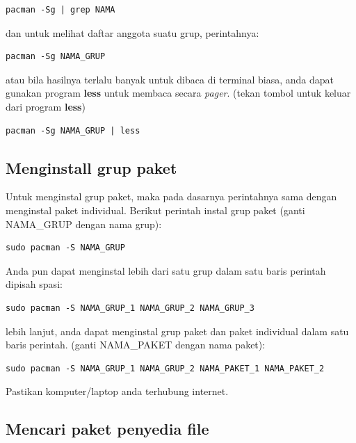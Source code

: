 \documentclass[12pt,]{article}
\begin{document}
	\begin{verbatim}
pacman -Sg | grep NAMA
	\end{verbatim}
	
	dan untuk melihat daftar anggota suatu grup, perintahnya:
	
	\begin{verbatim}
pacman -Sg NAMA_GRUP
	\end{verbatim}
	
	atau bila hasilnya terlalu banyak untuk dibaca di terminal biasa, anda dapat gunakan program \textbf{less} untuk membaca secara \textit{pager}.
	(tekan tombol  untuk keluar dari program \textbf{less})
	
	\begin{verbatim}
pacman -Sg NAMA_GRUP | less
	\end{verbatim}
	
	\subsection{Menginstall grup paket }
	
	Untuk menginstal grup paket, maka pada dasarnya perintahnya sama dengan menginstal paket individual.
	Berikut perintah instal grup paket (ganti NAMA\_GRUP dengan nama grup):
	
	\begin{verbatim}
sudo pacman -S NAMA_GRUP
	\end{verbatim}
	
	Anda pun dapat menginstal lebih dari satu grup dalam satu baris perintah dipisah spasi:
	
	\begin{verbatim}
sudo pacman -S NAMA_GRUP_1 NAMA_GRUP_2 NAMA_GRUP_3
	\end{verbatim}
	
	lebih lanjut, anda dapat menginstal grup paket dan paket individual dalam satu baris perintah.
	(ganti NAMA\_PAKET dengan nama paket):

	\begin{verbatim}
sudo pacman -S NAMA_GRUP_1 NAMA_GRUP_2 NAMA_PAKET_1 NAMA_PAKET_2
	\end{verbatim}
	
	Pastikan komputer/laptop anda terhubung internet.
	
	\subsection{Mencari paket penyedia file}
	
\end{document}

